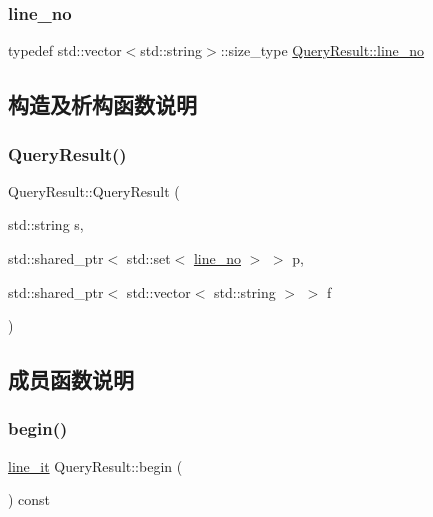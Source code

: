 \mbox{\label{classQueryResult_a34e6c64fb173f43499443469009c262f}} 
\subsubsection{\texorpdfstring{line\+\_\+no}{line\_no}}
{\footnotesize\ttfamily typedef std\+::vector$<$std\+::string$>$\+::size\+\_\+type \hyperlink{classQueryResult_a34e6c64fb173f43499443469009c262f}{Query\+Result\+::line\+\_\+no}}



\subsection{构造及析构函数说明}
\mbox{\label{classQueryResult_a9712669ad32f23c0875c1a2b4dc55ef2}} 
\subsubsection{\texorpdfstring{Query\+Result()}{QueryResult()}}
{\footnotesize\ttfamily Query\+Result\+::\+Query\+Result (\begin{DoxyParamCaption}\item[{std\+::string}]{s,  }\item[{std\+::shared\+\_\+ptr$<$ std\+::set$<$ \hyperlink{classQueryResult_a34e6c64fb173f43499443469009c262f}{line\+\_\+no} $>$ $>$}]{p,  }\item[{std\+::shared\+\_\+ptr$<$ std\+::vector$<$ std\+::string $>$ $>$}]{f }\end{DoxyParamCaption})\hspace{0.3cm}{\ttfamily [inline]}}



\subsection{成员函数说明}
\mbox{\label{classQueryResult_ac78944666adea9b2443e66bea6546857}} 
\subsubsection{\texorpdfstring{begin()}{begin()}}
{\footnotesize\ttfamily \hyperlink{classQueryResult_a863424dfa74a1048fdcb636a98aea670}{line\+\_\+it} Query\+Result\+::begin (\begin{DoxyParamCaption}{ }\end{DoxyParamCaption}) const\hspace{0.3cm}{\ttfamily [inline]}}


